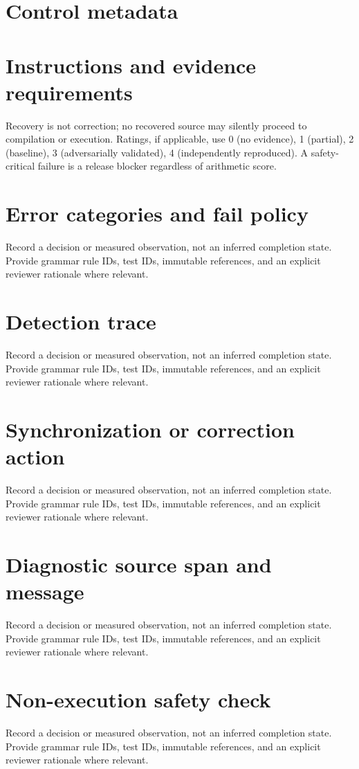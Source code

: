 \documentclass[11pt,letterpaper]{article}
\begin{document}
\makedoctitle\makedocsummary
\tableofcontents\clearpage
\section{Control metadata}
\section{Instructions and evidence requirements}
Recovery is not correction; no recovered source may silently proceed to compilation or execution. Ratings, if applicable, use 0 (no evidence), 1 (partial), 2 (baseline), 3 (adversarially validated), 4 (independently reproduced). A safety-critical failure is a release blocker regardless of arithmetic score.
\section{Error categories and fail policy}
Record a decision or measured observation, not an inferred completion state. Provide grammar rule IDs, test IDs, immutable references, and an explicit reviewer rationale where relevant.
\section{Detection trace}
Record a decision or measured observation, not an inferred completion state. Provide grammar rule IDs, test IDs, immutable references, and an explicit reviewer rationale where relevant.
\section{Synchronization or correction action}
Record a decision or measured observation, not an inferred completion state. Provide grammar rule IDs, test IDs, immutable references, and an explicit reviewer rationale where relevant.
\section{Diagnostic source span and message}
Record a decision or measured observation, not an inferred completion state. Provide grammar rule IDs, test IDs, immutable references, and an explicit reviewer rationale where relevant.
\section{Non-execution safety check}
Record a decision or measured observation, not an inferred completion state. Provide grammar rule IDs, test IDs, immutable references, and an explicit reviewer rationale where relevant.
\end{document}
